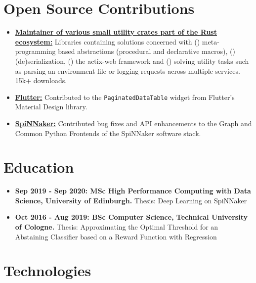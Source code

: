 \documentclass[10pt]{article}
\begin{document}
\section*{Open Source Contributions}

\begin{itemize}[label={}, leftmargin=*]

\item \href{https://crates.io/users/jofas}{\textbf{Maintainer of various
  small utility crates part of the Rust ecosystem:}}
Libraries containing solutions concerned with ()
meta-programming based abstractions (procedural and declarative
macros), () (de)serialization, ()
the actix-web framework and () solving utility tasks
such as parsing an environment file or logging requests across
multiple services. 15k+ downloads.

\item \href{https://github.com/flutter/flutter}{\textbf{Flutter:}}
Contributed to the \texttt{PaginatedDataTable} widget from Flutter's
Material Design library.

\item \href{https://github.com/SpiNNakerManchester}{\textbf{SpiNNaker:}}
Contributed bug fixes and API enhancements to the Graph and Common
Python Frontends of the SpiNNaker software stack.

\end{itemize}

\section*{Education}

\begin{itemize}[label={}, leftmargin=*]

\item \textbf{Sep 2019 - Sep 2020: MSc High Performance Computing with Data
  Science, University of Edinburgh.} Thesis: Deep Learning on SpiNNaker

\item \textbf{Oct 2016 - Aug 2019: BSc Computer Science, Technical
  University of Cologne.} Thesis: Approximating the Optimal Threshold
  for an Abstaining Classifier based on a Reward Function with Regression

\end{itemize}

\section*{Technologies}
\end{document}
